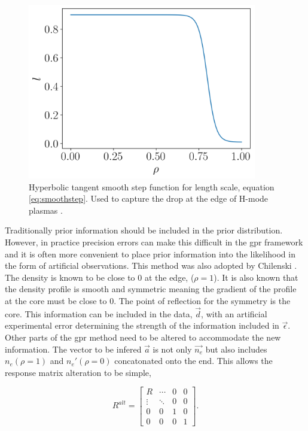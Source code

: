 \begin{figure}[H]
  \centering
  \includegraphics[width=10cm]{images/smoothstep.png}
  \caption{Hyperbolic tangent smooth step function for length scale, equation \ref{eq:smoothstep}. Used to capture the drop at the edge of H-mode plasmas \cite{chilenski}.}
  \label{fig:smoothstep}
\end{figure}


Traditionally prior information should be included in the prior distribution. However, in practice precision errors can make this difficult in the \gls{gpr} framework and it is often more convenient to place prior information into the likelihood in the form of artificial observations. This method was also adopted by Chilenski \cite{chilenski}. The density is known to be close to 0 at the edge, ($\rho=1$). It is also known that the density profile is smooth and symmetric meaning the gradient of the profile at the core must be close to 0. The point of reflection for the symmetry is the core. This information can be included in the data, $\vec{d}$, with an artificial experimental error determining the strength of the information included in $\vec{\epsilon}$. Other parts of the \gls{gpr} method need to be altered to accommodate the new information. The vector to be infered $\vec{a}$ is not only $\vec{n_e}$ but also includes $n_e(\rho=1)$ and $n_e'(\rho=0)$ concatonated onto the end. This allows the response matrix alteration to be simple,

\begin{equation}
  R^{alt} =
  \begin{bmatrix}
    R & \cdots & 0 & 0\\
    \vdots & \ddots & 0 & 0\\
    0 & 0 & 1 & 0 \\
    0 & 0 & 0 & 1
  \end{bmatrix}.
  \label{eq:Ralt}
\end{equation}

